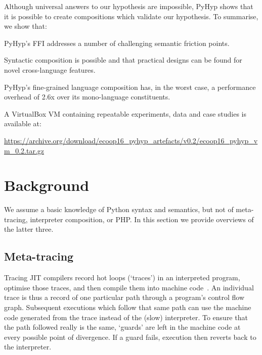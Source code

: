 \documentclass[a4paper,UKenglish]{lipics-v2016}
\newcommand{\ourvm}{PyHyp\xspace}
\begin{document}
Although universal answers to our hypothesis are impossible, \ourvm shows
that it is possible to create compositions which validate our
hypothesis. To summarise, we show that:

\vspace{-5pt}
\begin{enumerate*}
    \item \ourvm's FFI addresses a number of challenging semantic
        friction points.
    \item Syntactic composition is possible and that practical
        designs can be found for novel cross-language features.
    \item \ourvm's fine-grained language composition has, in the worst case,
        a performance overhead of 2.6x over its mono-language constituents.
\end{enumerate*}
\vspace{-5pt}

\noindent A VirtualBox VM containing repeatable experiments, data and case
studies is available at:\vspace{-0.2em}
\begin{center}
\small
\url{https://archive.org/download/ecoop16_pyhyp_artefacts/v0.2/ecoop16_pyhyp_vm_0.2.tar.gz}
\end{center}


\section{Background}

We assume a basic knowledge of Python syntax and semantics, but not of
meta-tracing, interpreter composition, or PHP. In this section we provide
overviews of the latter three.

\subsection{Meta-tracing}
\label{sec:metatrace}

Tracing JIT compilers record hot loops (`traces') in an interpreted program,
optimise those traces, and then compile them into machine
code~\cite{bala00dynamo,gal06hotpathvm}. An individual trace is thus a record of
one particular path through a program's control flow graph. Subsequent
executions which follow that same path can use the machine code generated from
the trace instead of the (slow) interpreter. To ensure that the path followed
really is the same, `guards' are left in the machine code at every possible
point of divergence. If a guard fails, execution then reverts back to the
interpreter.
\end{document}
